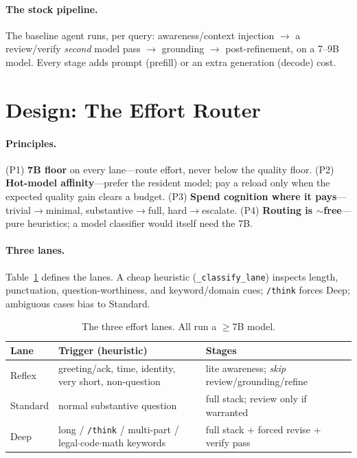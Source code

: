 \documentclass[10pt,twocolumn]{article}
\begin{document}
\paragraph{The stock pipeline.}
The baseline agent runs, per query: awareness/context injection $\to$ a
review/verify \emph{second} model pass $\to$ grounding $\to$
post-refinement, on a 7--9B model. Every stage adds prompt (prefill) or an
extra generation (decode) cost.

\section{Design: The Effort Router}
\label{sec:design}

\paragraph{Principles.}
(P1) \textbf{7B floor} on every lane---route effort, never below the
quality floor. (P2) \textbf{Hot-model affinity}---prefer the resident
model; pay a reload only when the expected quality gain clears a budget.
(P3) \textbf{Spend cognition where it pays}---trivial$\to$minimal,
substantive$\to$full, hard$\to$escalate. (P4) \textbf{Routing is
$\sim$free}---pure heuristics; a model classifier would itself need the
7B.

\paragraph{Three lanes.}
Table~\ref{tab:lanes} defines the lanes. A cheap heuristic
(\texttt{\_classify\_lane}) inspects length, punctuation, question-worthiness,
and keyword/domain cues; \texttt{/think} forces Deep; ambiguous cases bias
to Standard.

\begin{table}[t]
  \centering
  \caption{The three effort lanes. All run a $\geq$7B model.}
  \label{tab:lanes}
  \small
  \begin{tabular}{lp{3.1cm}l}
    \toprule
    Lane & Trigger (heuristic) & Stages \\
    \midrule
    Reflex   & greeting/ack, time, identity, very short, non-question & lite awareness; \emph{skip} review/grounding/refine \\
    Standard & normal substantive question & full stack; review only if warranted \\
    Deep     & long / \texttt{/think} / multi-part / legal$\cdot$code$\cdot$math keywords & full stack + forced revise + verify pass \\
    \bottomrule
  \end{tabular}
\end{table}
\end{document}
